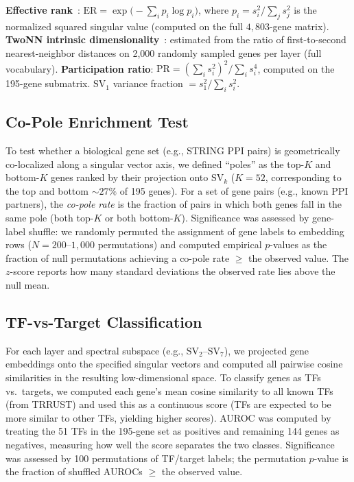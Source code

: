 \documentclass[12pt]{article}
\newcommand{\SV}[1]{\mathrm{SV}_{#1}}
\begin{document}
\textbf{Effective rank}~\cite{roy2007effective}: $\mathrm{ER} = \exp\!\bigl(-\sum_i p_i \log p_i\bigr)$, where $p_i = s_i^2 / \sum_j s_j^2$ is the normalized squared singular value (computed on the full $4{,}803$-gene matrix).
\textbf{TwoNN intrinsic dimensionality}~\cite{facco2017estimating}: estimated from the ratio of first-to-second nearest-neighbor distances on 2{,}000 randomly sampled genes per layer (full vocabulary).
\textbf{Participation ratio}: $\mathrm{PR} = (\sum_i s_i^2)^2 / \sum_i s_i^4$, computed on the 195-gene submatrix.
$\SV{1}$ variance fraction $= s_1^2 / \sum_i s_i^2$.

\subsection{Co-Pole Enrichment Test}
To test whether a biological gene set (e.g., STRING PPI pairs) is geometrically co-localized along a singular vector axis, we defined ``poles'' as the top-$K$ and bottom-$K$ genes ranked by their projection onto $\SV{k}$ ($K = 52$, corresponding to the top and bottom ${\sim}27\%$ of 195 genes).
For a set of gene pairs (e.g., known PPI partners), the \emph{co-pole rate} is the fraction of pairs in which both genes fall in the same pole (both top-$K$ or both bottom-$K$).
Significance was assessed by gene-label shuffle: we randomly permuted the assignment of gene labels to embedding rows ($N = 200$--$1{,}000$ permutations) and computed empirical $p$-values as the fraction of null permutations achieving a co-pole rate $\geq$ the observed value.
The $z$-score reports how many standard deviations the observed rate lies above the null mean.

\subsection{TF-vs-Target Classification}
\label{sec:methods_classification}
For each layer and spectral subspace (e.g., $\SV{2}$--$\SV{7}$), we projected gene embeddings onto the specified singular vectors and computed all pairwise cosine similarities in the resulting low-dimensional space.
To classify genes as TFs vs.\ targets, we computed each gene's mean cosine similarity to all known TFs (from TRRUST) and used this as a continuous score (TFs are expected to be more similar to other TFs, yielding higher scores).
AUROC was computed by treating the 51 TFs in the 195-gene set as positives and remaining 144 genes as negatives, measuring how well the score separates the two classes.
Significance was assessed by 100 permutations of TF/target labels; the permutation $p$-value is the fraction of shuffled AUROCs $\geq$ the observed value.
\end{document}
